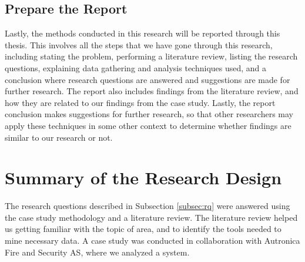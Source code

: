 \subsection{Prepare the Report}
Lastly, the methods conducted in this research will be reported through this thesis. This involves all the steps that we have gone through this research, including stating the problem, performing a literature review, listing the research questions, explaining data gathering and analysis techniques used, and a conclusion where research questions are answered and suggestions are made for further research. The report also includes findings from the literature review, and how they are related to our findings from the case study. Lastly, the report conclusion makes suggestions for further research, so that other researchers may apply these techniques in some other context to determine whether findings are similar to our research or not.


\section{Summary of the Research Design}
The research questions described in Subsection \ref{subsec:rq} were answered using the case study methodology and a literature review. The literature review helped us getting familiar with the topic of area, and to identify the tools needed to mine necessary data. A case study was conducted in collaboration with Autronica Fire and Security AS, where we analyzed a system.



























